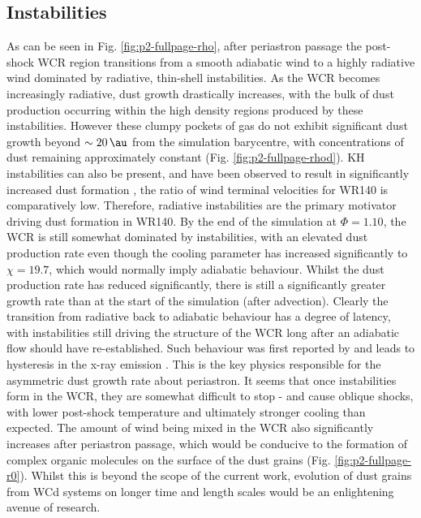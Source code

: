 \documentclass[fleqn,usenatbib]{mnras}
\begin{document}
\subsection{Instabilities}
\label{sec:p2-instab}


As can be seen in Fig. \ref{fig:p2-fullpage-rho}, after periastron passage the post-shock WCR region transitions from a smooth adiabatic wind to a highly radiative wind dominated by radiative, thin-shell instabilities.
As the WCR becomes increasingly radiative, dust growth drastically increases, with the bulk of dust production occurring within the high density regions produced by these instabilities.
However these clumpy pockets of gas do not exhibit significant dust growth beyond $\sim \SI{20}{\au}$ from the simulation barycentre, with concentrations of dust remaining approximately constant (Fig. \ref{fig:p2-fullpage-rhod}).
KH instabilities can also be present, and have been observed to result in significantly increased dust formation \citep{eatsonExplorationDustGrain2022}, the ratio of wind terminal velocities for WR140 is comparatively low.
Therefore, radiative instabilities are the primary motivator driving dust formation in WR140.
By the end of the simulation at $\Phi = 1.10$, the WCR is still somewhat dominated by instabilities, with an elevated dust production rate even though the cooling parameter has increased significantly to $\chi = 19.7$, which would normally imply adiabatic behaviour.
Whilst the dust production rate has reduced significantly, there is still a significantly greater growth rate than at the start of the simulation (after advection).
Clearly the transition from radiative back to adiabatic behaviour has a degree of latency, with instabilities still driving the structure of the WCR long after an adiabatic flow should have re-established.
Such behaviour was first reported by \cite{pittard_3d_2009} and leads to hysteresis in the x-ray emission \citep{pittard_3d_2010}.
This is the key physics responsible for the asymmetric dust growth rate about periastron.
It seems that once instabilities form in the WCR, they are somewhat difficult to stop - and cause oblique shocks, with lower post-shock temperature and ultimately stronger cooling than expected.
The amount of wind being mixed in the WCR also significantly increases after periastron passage, which would be conducive to the formation of complex organic molecules on the surface of the dust grains (Fig. \ref{fig:p2-fullpage-r0}).
Whilst this is beyond the scope of the current work, evolution of dust grains from WCd systems on longer time and length scales would be an enlightening avenue of research.
\end{document}
